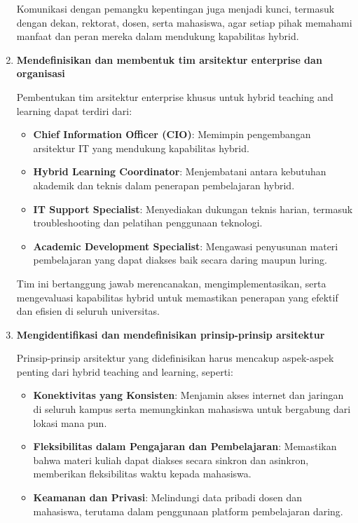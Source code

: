 \begin{enumerate}
	Komunikasi dengan pemangku kepentingan juga menjadi kunci, termasuk dengan dekan, rektorat, dosen, serta mahasiswa, agar setiap pihak memahami manfaat dan peran mereka dalam mendukung kapabilitas hybrid.
	
	\item \textbf{Mendefinisikan dan membentuk tim arsitektur enterprise dan organisasi}
	
	Pembentukan tim arsitektur enterprise khusus untuk hybrid teaching and learning dapat terdiri dari:
	\begin{itemize}
		\item \textbf{Chief Information Officer (CIO)}: Memimpin pengembangan arsitektur IT yang mendukung kapabilitas hybrid.
		\item \textbf{Hybrid Learning Coordinator}: Menjembatani antara kebutuhan akademik dan teknis dalam penerapan pembelajaran hybrid.
		\item \textbf{IT Support Specialist}: Menyediakan dukungan teknis harian, termasuk troubleshooting dan pelatihan penggunaan teknologi.
		\item \textbf{Academic Development Specialist}: Mengawasi penyusunan materi pembelajaran yang dapat diakses baik secara daring maupun luring.
	\end{itemize}
	
	Tim ini bertanggung jawab merencanakan, mengimplementasikan, serta mengevaluasi kapabilitas hybrid untuk memastikan penerapan yang efektif dan efisien di seluruh universitas.
	
	\item \textbf{Mengidentifikasi dan mendefinisikan prinsip-prinsip arsitektur}
	
	Prinsip-prinsip arsitektur yang didefinisikan harus mencakup aspek-aspek penting dari hybrid teaching and learning, seperti:
	\begin{itemize}
		\item \textbf{Konektivitas yang Konsisten}: Menjamin akses internet dan jaringan di seluruh kampus serta memungkinkan mahasiswa untuk bergabung dari lokasi mana pun.
		\item \textbf{Fleksibilitas dalam Pengajaran dan Pembelajaran}: Memastikan bahwa materi kuliah dapat diakses secara sinkron dan asinkron, memberikan fleksibilitas waktu kepada mahasiswa.
		\item \textbf{Keamanan dan Privasi}: Melindungi data pribadi dosen dan mahasiswa, terutama dalam penggunaan platform pembelajaran daring.
	\end{itemize}
	

\end{enumerate}
